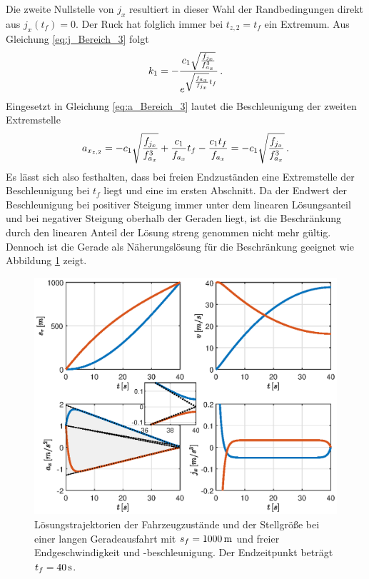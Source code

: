 Die zweite Nullstelle von $j_x$ resultiert in dieser Wahl der Randbedingungen direkt aus $j_x(t_f) = 0$. Der Ruck hat folglich immer bei $t_{z,2} = t_f$ ein Extremum. Aus Gleichung \eqref{eq:j_Bereich_3} folgt 
\begin{equation}
k_1 = -\frac{c_1\sqrt{\frac{f_{j_x}}{f_{a_x}^3}}}{e^{\sqrt{\frac{f_{a_x}}{f_{j_x}}}t_f}}\,.
\end{equation}
Eingesetzt in Gleichung \eqref{eq:a_Bereich_3} lautet die Beschleunigung der zweiten Extremstelle
\begin{equation}
a_{x_{z,2}} = -c_1\sqrt{\frac{f_{j_x}}{f_{a_x}^3}} + \frac{c_1}{f_{a_x}}t_f - \frac{c_1t_f}{f_{a_x}} = -c_1\sqrt{\frac{f_{j_x}}{f_{a_x}^3}}\,. 
\end{equation}
Es lässt sich also festhalten, dass bei freien Endzuständen eine Extremstelle der Beschleunigung bei $t_f$ liegt und eine im ersten Abschnitt. Da der Endwert der Beschleunigung bei positiver Steigung immer unter dem linearen Lösungsanteil und bei negativer Steigung oberhalb der Geraden liegt, ist die Beschränkung durch den linearen Anteil der Lösung streng genommen nicht mehr gültig. Dennoch ist die Gerade als Näherungslösung für die Beschränkung geeignet wie Abbildung \ref{fig:vf_af_frei} zeigt. 
\begin{figure}[h] 
	\centering
	\includegraphics[width=\linewidth]{./Bilder/Ergebnisse/Geradeausfahrt/vf_af_frei_mit_zoom.eps}
	\caption{Lösungstrajektorien der Fahrzeugzustände und der Stellgröße bei einer langen Geradeausfahrt mit $s_f=1000\,\mathrm{m}$ und freier Endgeschwindigkeit und -beschleunigung. Der Endzeitpunkt beträgt $t_f = 40\,\mathrm{s}$.}
	\label{fig:vf_af_frei}
\end{figure} 
